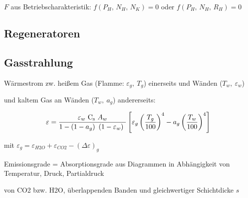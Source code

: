 	 $ F $ aus Betriebscharakteristik: $ f(P_H, \,N_H, \,N_K) = 0 $ oder $ f(P_H, \,N_H, \,R_H) = 0 $

\subsection{Regeneratoren}


\subsection{Gasstrahlung}
	Wärmestrom zw. heißem Gas (Flamme: $ \varepsilon_g,~ T_g $) einerseits und Wänden ($ T_w,~ \varepsilon_w $)

	und kaltem Gas an Wänden ($ T_w,~ a_g $) andererseits:

	\[ \varepsilon = \dfrac{\varepsilon_w\ \Cs\ A_w}{1-\left(1-a_g\right)\ (1-\varepsilon_w)\ } \left[ \varepsilon_g \left( \dfrac{T_g}{100} \right)^4 - a_g \left( \dfrac{T_w}{100} \right)^4 \right] \]

	mit $ \varepsilon_g  =  \varepsilon_{H2O} + \varepsilon_{CO2} - (\Delta\varepsilon)_g  $



	Emissionsgrade = Absorptionsgrade aus Diagrammen in Abhängigkeit von Temperatur, Druck, Partialdruck

	von CO2 bzw. H2O, überlappenden Banden und gleichwertiger Schichtdicke $ s $



